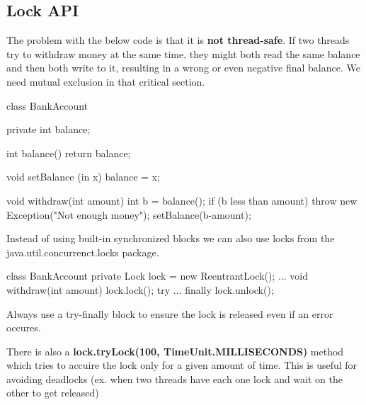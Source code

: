 \subsection{Lock API}

\begin{example}
    The problem with the below code is that it is \textbf{not thread-safe}. If two threads try to withdraw money
    at the same time, they might both read the same balance and then both write to it, resulting in a
    wrong or even negative final balance. We need mutual exclusion in that critical section.
\end{example}

\begin{codeexample}
class BankAccount {
    private int balance;

    int balance() {return balance;}

    void setBalance (in x) {balance = x;}

    void withdraw(int amount) {
        int b = balance();
        if (b less than amount) {
            throw new Exception("Not enough money");
        }
        setBalance(b-amount);
    }
}
\end{codeexample}

Instead of using built-in synchronized blocks we can also use locks from the java.util.concurrenct.locks package.

\begin{codeexample}
class BankAccount {
    private Lock lock = new ReentrantLock();
    ...
    void withdraw(int amount) {
        lock.lock();
        try {
            ...
        } finally {
            lock.unlock();
        }
    }
}
            
\end{codeexample}

\begin{important}
    Always use a try-finally block to ensure the lock is released even if an error occures.            
\end{important}

\begin{remark}
    There is also a \textbf{lock.tryLock(100, TimeUnit.MILLISECONDS)} method which tries to accuire the lock only for
    a given amount of time. This is useful for avoiding deadlocks (ex. when two threads have each one lock
    and wait on the other to get released)
\end{remark}

